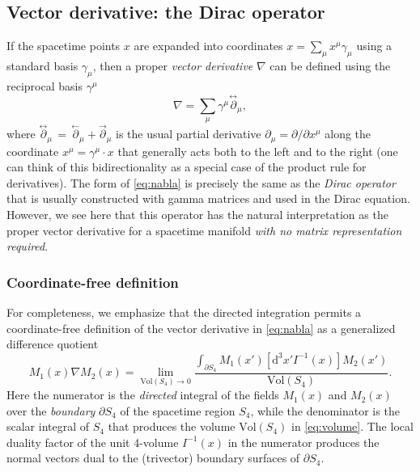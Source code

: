 \documentclass[1p,sort&compress]{elsarticle}
\numberwithin{equation}{section}
\begin{document}
\subsection{Vector derivative: the Dirac operator}


If the spacetime points $x$ are expanded into coordinates $x = \sum_\mu x^\mu \gamma_\mu$ using a standard basis $\gamma_\mu$, then a proper \emph{vector derivative} $\nabla$ can be defined using the reciprocal basis $\gamma^\mu$
\begin{equation}\label{eq:nabla}
  \nabla = \sum_\mu \gamma^\mu \stackrel{\leftrightarrow}{\partial}_\mu,
\end{equation}
where $\stackrel{\leftrightarrow}{\partial}_\mu \,=\, \stackrel{\leftarrow}{\partial}_\mu \!+\! \stackrel{\rightarrow}{\partial}_\mu$ is the usual partial derivative $\partial_\mu = \partial/\partial x^\mu$ along the coordinate $x^\mu = \gamma^\mu \cdot x$ that generally acts both to the left and to the right (one can think of this bidirectionality as a special case of the product rule for derivatives).  The form of \eqref{eq:nabla} is precisely the same as the \emph{Dirac operator} that is usually constructed with gamma matrices and used in the Dirac equation.  However, we see here that this operator has the natural interpretation as the proper vector derivative for a spacetime manifold \emph{with no matrix representation required}.    


\subsubsection{Coordinate-free definition}


For completeness, we emphasize that the directed integration permits a coordinate-free definition of the vector derivative in \eqref{eq:nabla} as a generalized difference quotient \cite{Hestenes1968}
\begin{equation}\label{eq:invariantnabla}
  M_1(x)\nabla M_2(x) = \lim_{\text{Vol}(S_4) \to 0} \frac{\int_{\partial S_4} M_1(x') [\textrm{d}^3\!x' I^{-1}(x)] M_2(x')}{\text{Vol}(S_4)}.
\end{equation}
Here the numerator is the \emph{directed} integral of the fields $M_1(x)$ and $M_2(x)$ over the \emph{boundary} $\partial S_4$ of the spacetime region $S_4$, while the denominator is the scalar integral of $S_4$ that produces the volume $\text{Vol}(S_4)$ in \eqref{eq:volume}.  The local duality factor of the unit 4-volume $I^{-1}(x)$ in the numerator produces the normal vectors dual to the (trivector) boundary surfaces of $\partial S_4$.  
\end{document}
